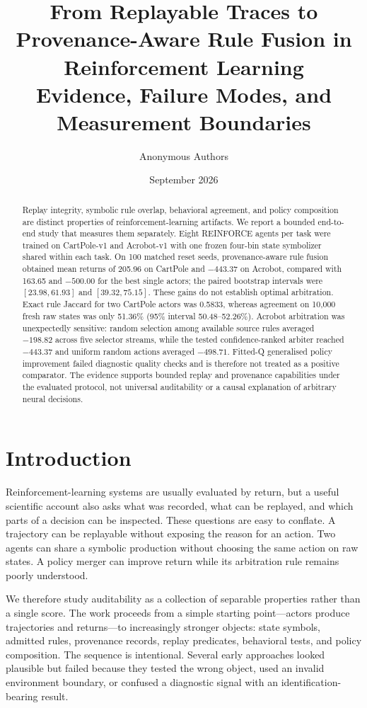 \documentclass[11pt,a4paper]{article}
\title{From Replayable Traces to Provenance-Aware Rule Fusion in Reinforcement Learning\\
Evidence, Failure Modes, and Measurement Boundaries}
\author{Anonymous Authors}
\date{September 2026}
\begin{document}
\maketitle

\begin{abstract}
Replay integrity, symbolic rule overlap, behavioral agreement, and policy composition are distinct properties of reinforcement-learning artifacts. We report a bounded end-to-end study that measures them separately. Eight REINFORCE agents per task were trained on CartPole-v1 and Acrobot-v1 with one frozen four-bin state symbolizer shared within each task. On 100 matched reset seeds, provenance-aware rule fusion obtained mean returns of 205.96 on CartPole and $-443.37$ on Acrobot, compared with 163.65 and $-500.00$ for the best single actors; the paired bootstrap intervals were $[23.98,61.93]$ and $[39.32,75.15]$. These gains do not establish optimal arbitration. Exact rule Jaccard for two CartPole actors was 0.5833, whereas agreement on 10,000 fresh raw states was only 51.36\% (95\% interval 50.48--52.26\%). Acrobot arbitration was unexpectedly sensitive: random selection among available source rules averaged $-198.82$ across five selector streams, while the tested confidence-ranked arbiter reached $-443.37$ and uniform random actions averaged $-498.71$. Fitted-Q generalised policy improvement failed diagnostic quality checks and is therefore not treated as a positive comparator. The evidence supports bounded replay and provenance capabilities under the evaluated protocol, not universal auditability or a causal explanation of arbitrary neural decisions.
\end{abstract}

\section{Introduction}
\label{sec:intro}

Reinforcement-learning systems are usually evaluated by return, but a useful scientific account also asks what was recorded, what can be replayed, and which parts of a decision can be inspected. These questions are easy to conflate. A trajectory can be replayable without exposing the reason for an action. Two agents can share a symbolic production without choosing the same action on raw states. A policy merger can improve return while its arbitration rule remains poorly understood.

We therefore study auditability as a collection of separable properties rather than a single score. The work proceeds from a simple starting point---actors produce trajectories and returns---to increasingly stronger objects: state symbols, admitted rules, provenance records, replay predicates, behavioral tests, and policy composition. The sequence is intentional. Several early approaches looked plausible but failed because they tested the wrong object, used an invalid environment boundary, or confused a diagnostic signal with an identification-bearing result.
\end{document}
